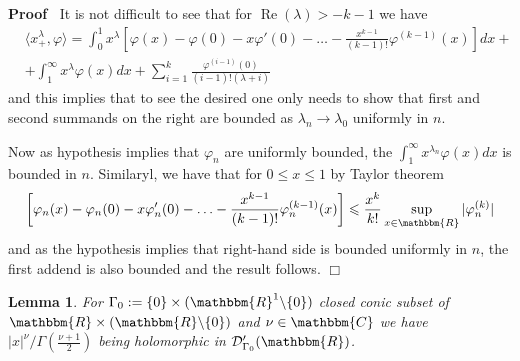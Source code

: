 \documentclass{article}
\newcommand{\assign}{:=}
\newcommand{\tmop}[1]{\ensuremath{\operatorname{#1}}}
\newenvironment{proof}{\noindent\textbf{Proof\ }}{\hspace*{\fill}$\Box$\medskip}
\numberwithin{definition}{section}
\newtheorem{lemma}{Lemma}
\numberwithin{lemma}{section}
\numberwithin{proposition}{section}
{\theorembodyfont{\rmfamily}\newtheorem{remark}{Remark}
\numberwithin{remark}{section}
}
\begin{document}
\begin{proof}
  It is not difficult to see that for $\tmop{Re} ( \lambda) > - k - 1$ we have
  \begin{eqnarray}
    & \langle x_+^{\lambda}, \varphi \rangle = \int_0^1 x^{\lambda} \left[
    \varphi ( x) - \varphi ( 0) - x \varphi' ( 0) - \ldots - \frac{x^{k -
    1}}{( k - 1) !} \varphi^{( k - 1)} ( x) \right] d x + &  \nonumber\\
    & + \int_1^{\infty} x^{\lambda} \varphi ( x) d x + \sum_{i = 1}^k
    \frac{\varphi^{( i - 1)} ( 0)}{( i - 1) ! ( \lambda + i)} &  \nonumber
  \end{eqnarray}
  and this implies that to see the desired one only needs to show that first
  and second summands on the right are bounded as $\lambda_n \rightarrow
  \lambda_0$ uniformly in $n$.
  
  Now as hypothesis implies that $\varphi_n$ are uniformly bounded, the
  $\int_1^{\infty} x^{\lambda_n} \varphi ( x) d x$ is bounded in $n$.
  Similaryl, we have that for $0 \leqslant x \leqslant 1$ by Taylor theorem
  \[ \left[ \varphi_n ( x) - \varphi_n ( 0) - x \varphi'_n ( 0) - \ldots -
     \frac{x^{k - 1}}{( k - 1) !} \varphi^{( k - 1)}_n ( x) \right] \leqslant
     \frac{x^k}{k!} \sup_{x \in \mathbbm{R}} | \varphi_n^{( k)} | \]
  and as the hypothesis implies that right-hand side is bounded uniformly in
  $n$, the first addend is also bounded and the result follows.
\end{proof}

\begin{lemma}
  \label{supp-n-waves:lem-|x|-holo-in}For $\Gamma_0 \assign \{ 0 \} \times (
  \mathbbm{R}^1 \backslash \{ 0 \})$ closed conic subset of $\mathbbm{R}
  \times ( \mathbbm{R}\backslash \{ 0 \})$ and $\nu \in \mathbbm{C}$ we have
  $| x |^{\nu} / \Gamma \left( \frac{\nu + 1}{2} \right)$ being holomorphic in
  $\mathcal{D}'_{\Gamma_0} ( \mathbbm{R})$.
\end{lemma}
\end{document}
